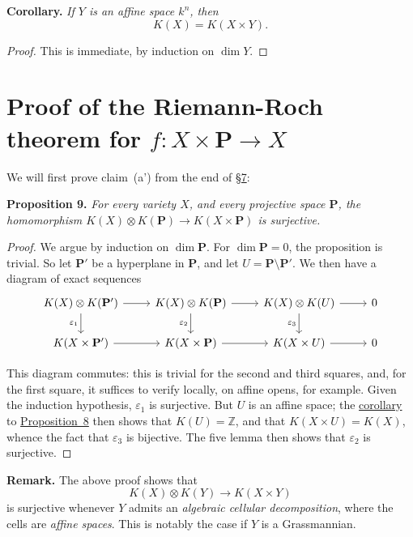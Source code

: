 \documentclass{article}
\newenvironment{itenv}[1]
  {\phantomsection\par\medskip\noindent\textbf{#1.}\itshape}
  {\par\medskip}
\newenvironment{rmenv}[1]
  {\phantomsection\par\medskip\noindent\textbf{#1.}\rmfamily}
  {\par\medskip}
\newcommand{\PP}{\mathbf{P}}
\begin{document}
\begin{itenv}{Corollary}
\label{corollary-8}
  If $Y$ is an affine space $k^n$, then
  \[
    K(X) = K(X\times Y).
  \]
\end{itenv}

\begin{proof}
  This is immediate, by induction on $\dim Y$.
\end{proof}


\section{Proof of the Riemann-Roch theorem for \texorpdfstring{$f\colon X\times\mathbf{P}\to X$}{f:XxP->X}}
\label{section9}

We will first prove claim~(a') from the end of \hyperref[section7]{\S7}:

\begin{itenv}{Proposition 9}
\label{proposition9}
  For every variety $X$, and every projective space $\PP$, the homomorphism $K(X)\otimes K(\PP)\to K(X\times \PP)$ is surjective.
\end{itenv}

\begin{proof}
  We argue by induction on $\dim\PP$.
  For $\dim\PP=0$, the proposition is trivial.
  So let $\PP'$ be a hyperplane in $\PP$, and let $U=\PP\setminus\PP'$.
  We then have a diagram of exact sequences
  \[
    \begin{tikzcd}
      K(X)\otimes K(\PP') \rar \dar[swap,"\varepsilon_1"]
      & K(X)\otimes K(\PP) \rar \dar[swap,"\varepsilon_2"]
      & K(X)\otimes K(U) \rar \dar[swap,"\varepsilon_3"]
      & 0
    \\K(X\times\PP') \rar
      & K(X\times\PP) \rar
      & K(X\times U) \rar
      & 0
    \end{tikzcd}
  \]

  This diagram commutes:
  this is trivial for the second and third squares, and, for the first square, it suffices to verify locally, on affine opens, for example.
  Given the induction hypothesis, $\varepsilon_1$ is surjective.
  But $U$ is an affine space;
  the \hyperref[corollary-8]{corollary} to \hyperref[proposition8]{Proposition~8} then shows that $K(U)=\mathbb{Z}$, and that $K(X\times U)=K(X)$, whence the fact that $\varepsilon_3$ is bijective.
  The five lemma then shows that $\varepsilon_2$ is surjective.
\end{proof}

\begin{rmenv}{Remark}
  The above proof shows that
  \[
    K(X)\otimes K(Y) \to K(X\times Y)
  \]
  is surjective whenever $Y$ admits an \emph{algebraic cellular decomposition}, where the cells are \emph{affine spaces}.
  This is notably the case if $Y$ is a Grassmannian.
\end{rmenv}
\end{document}

